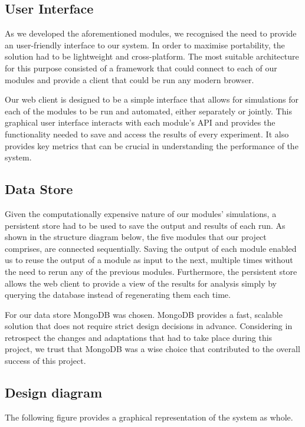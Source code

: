 \documentclass[a4paper,11pt]{article}
\begin{document}
\subsection{User Interface}
As we developed the aforementioned modules, we recognised the need to provide an user-friendly interface to our system. In order to maximise portability, the solution had to be lightweight and cross-platform. The most suitable architecture for this purpose consisted of a framework that could connect to each of our modules and provide a client that could be run any modern browser.

Our web client is designed to be a simple interface that allows for simulations for each of the modules to be run and automated, either separately or jointly. This graphical user interface interacts with each module's API and provides the functionality needed to save and access the results of every experiment. It also provides key metrics that can be crucial in understanding the performance of the system.

\subsection{Data Store}

Given the computationally expensive nature of our modules' simulations, a persistent store had to be used to save the output and results of each run. As shown in the structure diagram below, the five modules that our project comprises, are connected sequentially. Saving the output of each module enabled us to reuse the output of a module as input to the next, multiple times without the need to rerun any of the previous modules. Furthermore, the persistent store allows the web client to provide a view of the results for analysis simply by querying the database instead of regenerating them each time.

For our data store MongoDB \cite{mdb} was chosen. MongoDB provides a fast, scalable solution that does not require strict design decisions in advance. Considering in retrospect the changes and adaptations that had to take place during this project, we trust that MongoDB was a wise choice that contributed to the overall success of this project.


\subsection{Design diagram}
The following figure provides a graphical representation of the system as whole. 
\end{document}
